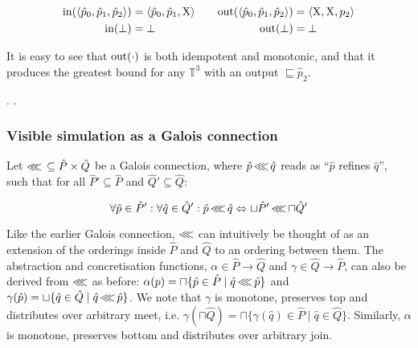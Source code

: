 

\begin{equation*}
\begin{aligned}[t]
\operatorname{in}(\langle \hat p_{0}, \hat p_{1}, \hat p_{2} \rangle) &= \langle \hat p_{0}, \hat p_{1}, \mathrm{X} \rangle \\
\operatorname{in}(\bot) &= \bot
\end{aligned}
\qquad
\begin{aligned}[t]
\operatorname{out}(\langle \hat p_{0}, \hat p_{1}, \hat p_{2} \rangle) &= \langle \mathrm{X}, \mathrm{X}, p_{2} \rangle \\
\operatorname{out}(\bot) &= \bot
\end{aligned}
\end{equation*}

\noindent It is easy to see that $\operatorname{out}(\cdot)$ is both idempotent and monotonic, and that it produces the greatest bound for any $\mathbb{T}^{3}$ with an output $\sqsubseteq \hat p_{2}$.

. .


\subsubsection{Visible simulation as a Galois connection}

Let $\operatorname{\lll} \, \subseteq \hat P \times \hat Q$ be a Galois connection, where $\hat p \operatorname{\lll} \hat q$ reads as ``$\hat p$ refines $\hat q$'', such that for all $\hat P' \subseteq \hat P$ and $\hat Q' \subseteq \hat Q$:

\begin{equation*}
\forall \hat p \in \hat P' : \forall \hat q \in \hat Q' : \hat p \operatorname{\lll} \hat q \Leftrightarrow \sqcup \hat P' \operatorname{\lll} \sqcap \hat Q'
\end{equation*}

\noindent Like the earlier Galois connection, $\operatorname{\lll}$ can intuitively be thought of as an extension of the orderings inside $\hat P$ and $\hat Q$ to an ordering between them. The abstraction and concretisation functions, $\alpha \in \hat P \rightarrow \hat Q$ and $\gamma \in \hat Q \rightarrow \hat P$, can also be derived from $\operatorname{\lll}$ as before: $\alpha(p) = \sqcap \{ \hat p \in \hat P \mid \hat q \operatorname{\lll} \hat p \}$ and $\gamma(\hat p) = \sqcup \{ \hat q \in \hat Q \mid \hat q \operatorname{\lll} \hat p \}$. We note that $\gamma$ is monotone, preserves top and distributes over arbitrary meet, i.e. $\gamma(\sqcap \hat Q) = \sqcap \{ \gamma(\hat q) \in \hat P \mid \hat q \in \hat Q\}$. Similarly, $\alpha$ is monotone, preserves bottom and distributes over arbitrary join.

